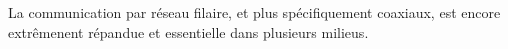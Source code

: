 La communication par réseau filaire, et plus spécifiquement coaxiaux, est encore
extrêmenent répandue et essentielle dans plusieurs milieus.